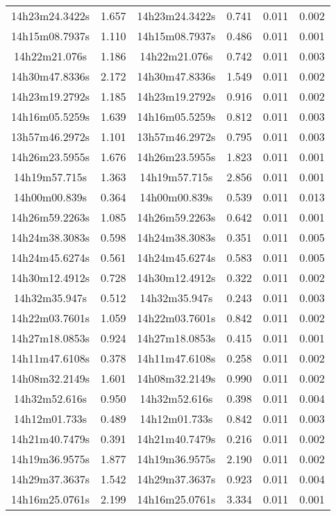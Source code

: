 \begin{table}
\begin{tabular}{cccccc}
14h23m24.3422s & 1.657 & 14h23m24.3422s & 0.741 & 0.011 & 0.002 \\
14h15m08.7937s & 1.110 & 14h15m08.7937s & 0.486 & 0.011 & 0.001 \\
14h22m21.076s & 1.186 & 14h22m21.076s & 0.742 & 0.011 & 0.003 \\
14h30m47.8336s & 2.172 & 14h30m47.8336s & 1.549 & 0.011 & 0.002 \\
14h23m19.2792s & 1.185 & 14h23m19.2792s & 0.916 & 0.011 & 0.002 \\
14h16m05.5259s & 1.639 & 14h16m05.5259s & 0.812 & 0.011 & 0.003 \\
13h57m46.2972s & 1.101 & 13h57m46.2972s & 0.795 & 0.011 & 0.003 \\
14h26m23.5955s & 1.676 & 14h26m23.5955s & 1.823 & 0.011 & 0.001 \\
14h19m57.715s & 1.363 & 14h19m57.715s & 2.856 & 0.011 & 0.001 \\
14h00m00.839s & 0.364 & 14h00m00.839s & 0.539 & 0.011 & 0.013 \\
14h26m59.2263s & 1.085 & 14h26m59.2263s & 0.642 & 0.011 & 0.001 \\
14h24m38.3083s & 0.598 & 14h24m38.3083s & 0.351 & 0.011 & 0.005 \\
14h24m45.6274s & 0.561 & 14h24m45.6274s & 0.583 & 0.011 & 0.005 \\
14h30m12.4912s & 0.728 & 14h30m12.4912s & 0.322 & 0.011 & 0.002 \\
14h32m35.947s & 0.512 & 14h32m35.947s & 0.243 & 0.011 & 0.003 \\
14h22m03.7601s & 1.059 & 14h22m03.7601s & 0.842 & 0.011 & 0.002 \\
14h27m18.0853s & 0.924 & 14h27m18.0853s & 0.415 & 0.011 & 0.001 \\
14h11m47.6108s & 0.378 & 14h11m47.6108s & 0.258 & 0.011 & 0.002 \\
14h08m32.2149s & 1.601 & 14h08m32.2149s & 0.990 & 0.011 & 0.002 \\
14h32m52.616s & 0.950 & 14h32m52.616s & 0.398 & 0.011 & 0.004 \\
14h12m01.733s & 0.489 & 14h12m01.733s & 0.842 & 0.011 & 0.003 \\
14h21m40.7479s & 0.391 & 14h21m40.7479s & 0.216 & 0.011 & 0.002 \\
14h19m36.9575s & 1.877 & 14h19m36.9575s & 2.190 & 0.011 & 0.002 \\
14h29m37.3637s & 1.542 & 14h29m37.3637s & 0.923 & 0.011 & 0.004 \\
14h16m25.0761s & 2.199 & 14h16m25.0761s & 3.334 & 0.011 & 0.001 \\

\end{tabular}
\end{table}

